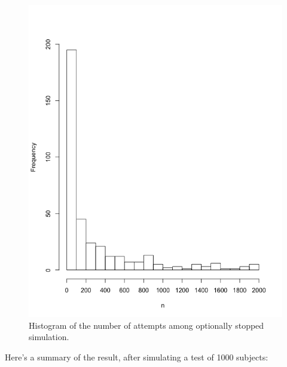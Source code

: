 \begin{figure}[h] 
\begin{center}
\includegraphics[scale=0.4]{freqstopn.png}
	\caption{Histogram of the number of attempts among optionally stopped simulation.}
	\label{fig:freqhistn}
\end{center}	
\end{figure}

Here's a summary of the result, after simulating a test of 1000 subjects:

